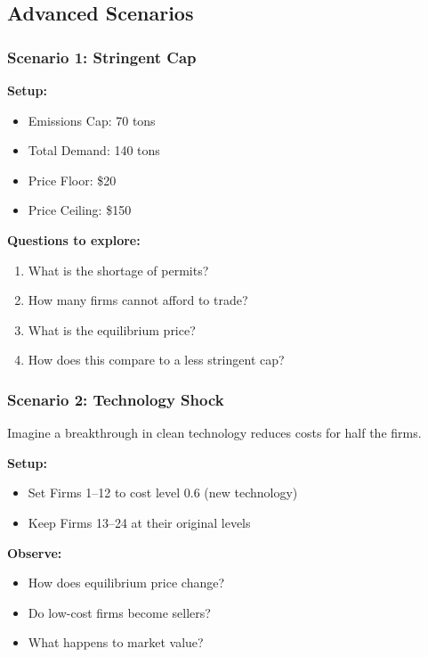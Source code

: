 \documentclass{tufte-handout}\usepackage[]{graphicx}\usepackage[]{xcolor}
\begin{document}
\subsection{Advanced Scenarios}

\subsubsection{Scenario 1: Stringent Cap}

\textbf{Setup:}
\begin{itemize}
\item Emissions Cap: 70 tons
\item Total Demand: 140 tons
\item Price Floor: \$20
\item Price Ceiling: \$150
\end{itemize}

\textbf{Questions to explore:}
\begin{enumerate}
\item What is the shortage of permits?
\item How many firms cannot afford to trade?
\item What is the equilibrium price?
\item How does this compare to a less stringent cap?
\end{enumerate}


\subsubsection{Scenario 2: Technology Shock}

Imagine a breakthrough in clean technology reduces costs for half the firms.

\textbf{Setup:}
\begin{itemize}
\item Set Firms 1--12 to cost level 0.6 (new technology)
\item Keep Firms 13--24 at their original levels
\end{itemize}

\textbf{Observe:}
\begin{itemize}
\item How does equilibrium price change?
\item Do low-cost firms become sellers?
\item What happens to market value?
\end{itemize}
\end{document}
